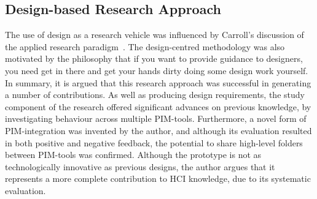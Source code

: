 

\subsection{Design-based Research Approach}
\label{disc:methodological-discussion:overall}

The use of design as a research vehicle was influenced by Carroll's discussion of the applied research paradigm~\citep{Carroll:00}.  The design-centred methodology was also motivated by the philosophy that if you want to provide guidance to designers, you need get in there and get your hands dirty doing some design work yourself.   In summary, it is argued that this research approach was successful in generating a number of contributions.  As well as producing design requirements, the study component of the research offered significant advances on previous knowledge, by investigating behaviour across multiple PIM-tools.  Furthermore, a novel form of PIM-integration was invented by the author, and although its evaluation resulted in both positive and negative feedback, the potential to share high-level folders between PIM-tools was confirmed.  Although the prototype is not as technologically innovative as previous designs, the author argues that it represents a more complete contribution to HCI knowledge, due to its systematic evaluation.  

